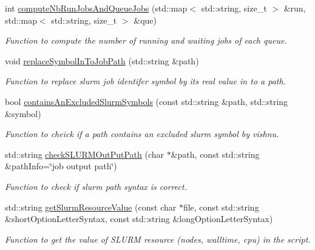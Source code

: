 \begin{DoxyCompactItemize}
int \hyperlink{classSlurmServer_a2b7eabbb5025b76e1828001d946a267e}{computeNbRunJobsAndQueueJobs} (std::map$<$ std::string, size\_\-t $>$ \&run, std::map$<$ std::string, size\_\-t $>$ \&que)
\begin{DoxyCompactList}\small\item\em Function to compute the number of running and waiting jobs of each queue. \item\end{DoxyCompactList}\item 
void \hyperlink{classSlurmServer_a27e52d883798ce8ba9d341da69364245}{replaceSymbolInToJobPath} (std::string \&path)
\begin{DoxyCompactList}\small\item\em Function to replace slurm job identifer symbol by its real value in to a path. \item\end{DoxyCompactList}\item 
bool \hyperlink{classSlurmServer_a81c65cc4a6b83c291b5ec2c8ca028169}{containsAnExcludedSlurmSymbols} (const std::string \&path, std::string \&symbol)
\begin{DoxyCompactList}\small\item\em Function to cheick if a path contains an excluded slurm symbol by vishnu. \item\end{DoxyCompactList}\item 
std::string \hyperlink{classSlurmServer_a6c33cb8cae0ca873cd8b59fe5df85634}{checkSLURMOutPutPath} (char $\ast$\&path, const std::string \&pathInfo=\char`\"{}job output path\char`\"{})
\begin{DoxyCompactList}\small\item\em Function to check if slurm path syntax is correct. \item\end{DoxyCompactList}\item 
std::string \hyperlink{classSlurmServer_ae3b9ae057e244c1fe1e471916af30c98}{getSlurmResourceValue} (const char $\ast$file, const std::string \&shortOptionLetterSyntax, const std::string \&longOptionLetterSyntax)
\begin{DoxyCompactList}\small\item\em Function to get the value of SLURM resource (nodes, walltime, cpu) in the script. \item\end{DoxyCompactList}\end{DoxyCompactItemize}
